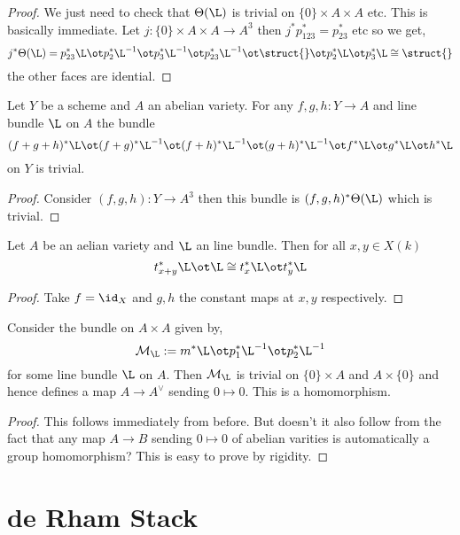 \documentclass[12pt]{article}
\newcommand{\cM}{\mathcal{M}}
\begin{document}
\begin{proof}
We just need to check that $\Theta(\L)$ is trivial on $\{ 0 \} \times A \times A$ etc. This is basically immediate. Let $j : \{ 0 \} \times A \times A \to A^3$ then $j^* p_{123}^* = p_{23}^*$ etc so we get,
\[ j^* \Theta(\L) = p_{23}^* \L \ot p_2^* \L^{-1} \ot p_{3}^* \L^{-1} \ot p_{23}^* \L^{-1} \ot \struct{} \ot p_2^* \L \ot p_3^* \L \cong \struct{} \]
the other faces are idential. 
\end{proof}

\begin{cor}
Let $Y$ be a scheme and $A$ an abelian variety. For any $f,g,h : Y \to A$ and line bundle $\L$ on $A$ the bundle
\[ (f + g + h)^* \L \ot (f + g)^* \L^{-1} \ot (f + h)^* \L^{-1} \ot (g + h)^* \L^{-1} \ot f^* \L \ot g^* \L \ot h^* \L \]
on $Y$ is trivial.
\end{cor}

\begin{proof}
Consider $(f,g,h) : Y \to A^3$ then this bundle is $(f,g,h)^* \Theta(\L)$ which is trivial. 
\end{proof}

\begin{cor}
Let $A$ be an aelian variety and $\L$ an line bundle. Then for all $x,y \in X(k)$ 
\[ t_{x+y}^* \L \ot \L \cong t_x^* \L \ot t_y^* \L \]
\end{cor}

\begin{proof}
Take $f = \id_X$ and $g,h$ the constant maps at $x,y$ respectively.
\end{proof}

\begin{cor}
Consider the bundle on $A \times A$ given by,
\[ \cM_{\L} := m^* \L \ot p_1^* \L^{-1} \ot p_2^* \L^{-1} \]
for some line bundle $\L$ on $A$. Then $\cM_{\L}$ is trivial on $\{ 0 \} \times A$ and $A \times \{ 0 \}$ and hence defines a map $A \to A^\vee$ sending $0 \mapsto 0$. This is a homomorphism.
\end{cor}

\begin{proof}
This follows immediately from before. But doesn't it also follow from the fact that any map $A \to B$ sending $0 \mapsto 0$ of abelian varities is automatically a group homomorphism? This is easy to prove by rigidity.
\end{proof}

\section{de Rham Stack}
\end{document}
